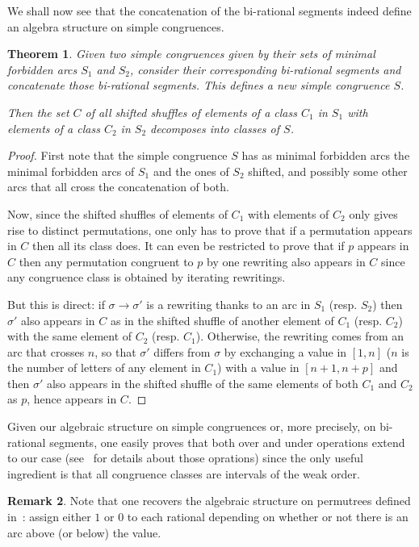 \documentclass{amsart}
\newtheorem{theorem}{Theorem}[section]
\theoremstyle{definition}
\newtheorem{remark}[theorem]{Remark}
\begin{document}
We shall now see that the concatenation of the bi-rational segments indeed
define an algebra structure on simple congruences.

\begin{theorem}
Given two simple congruences given by their sets of minimal forbidden
arcs $S_1$ and $S_2$, consider their corresponding bi-rational segments and
concatenate those bi-rational segments.
This defines a new simple congruence $S$.

Then the set $C$ of all shifted shuffles of elements of a class $C_1$ in $S_1$
with elements of a class $C_2$ in $S_2$ decomposes into classes of $S$.
\end{theorem}

\begin{proof}
First note that the simple congruence $S$ has as minimal forbidden arcs
the minimal forbidden arcs of $S_1$ and the ones of $S_2$ shifted, and
possibly some other arcs that all cross the concatenation of both.

Now, since the shifted shuffles of elements of $C_1$  with elements of $C_2$
only gives rise to distinct permutations, one only has to prove that if a
permutation appears in $C$ then all its class does.
It can even be restricted to prove that if $p$ appears in $C$ then any
permutation congruent to $p$ by one rewriting also appears in $C$ since any
congruence class is obtained by iterating rewritings.

But this is direct: if $\sigma\to \sigma'$ is a rewriting thanks to an arc in
$S_1$ (resp. $S_2$) then $\sigma'$ also appears in $C$ as in the shifted
shuffle of another element of $C_1$ (resp. $C_2$) with the same element of
$C_2$ (resp.  $C_1$). Otherwise, the rewriting comes from an arc that crosses
$n$, so that $\sigma'$ differs from $\sigma$ by exchanging a value in $[1,n]$
($n$ is the number of letters of any element in $C_1$) with a value in
$[n+1,n+p]$ and then $\sigma'$ also appears in the shifted shuffle of the same
elements of both $C_1$ and $C_2$ as $p$, hence appears in $C$.
\end{proof}

Given our algebraic structure on simple congruences or, more precisely, on
bi-rational segments, one easily proves that both over and under operations
extend to our case (see~\cite{PilaudPons-permutrees} for details about those
oprations) since the only useful ingredient is that all congruence classes
are intervals of the weak order.

\begin{remark}
Note that one recovers the algebraic structure on permutrees defined
in~\cite{PilaudPons-permutrees}: assign either $1$ or $0$ to each rational
depending on whether or not there is an arc above (or below) the value.
\end{remark}
\end{document}
